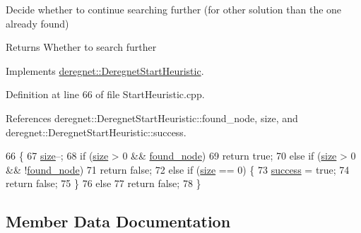 Decide whether to continue searching further (for other solution than the one already found) 

\begin{DoxyReturn}{Returns}
Whether to search further 
\end{DoxyReturn}


Implements \hyperlink{classderegnet_1_1DeregnetStartHeuristic_ac3ee2c3022512f9d4ec7a6b49358e60a}{deregnet\+::\+Deregnet\+Start\+Heuristic}.



Definition at line 66 of file Start\+Heuristic.\+cpp.



References deregnet\+::\+Deregnet\+Start\+Heuristic\+::found\+\_\+node, size, and deregnet\+::\+Deregnet\+Start\+Heuristic\+::success.


\begin{DoxyCode}
66                                     \{
67     \hyperlink{classderegnet_1_1StartHeuristic_acd3b3c6a5103491c252b774545ad470b}{size}--;
68     \textcolor{keywordflow}{if} (\hyperlink{classderegnet_1_1StartHeuristic_acd3b3c6a5103491c252b774545ad470b}{size} > 0 && \hyperlink{classderegnet_1_1DeregnetStartHeuristic_a1ca705794583fb3b6e563efeceb4445e}{found\_node})
69         \textcolor{keywordflow}{return} \textcolor{keyword}{true};
70     \textcolor{keywordflow}{else} \textcolor{keywordflow}{if} (\hyperlink{classderegnet_1_1StartHeuristic_acd3b3c6a5103491c252b774545ad470b}{size} > 0 && !\hyperlink{classderegnet_1_1DeregnetStartHeuristic_a1ca705794583fb3b6e563efeceb4445e}{found\_node})
71         \textcolor{keywordflow}{return} \textcolor{keyword}{false};
72     \textcolor{keywordflow}{else} \textcolor{keywordflow}{if} (\hyperlink{classderegnet_1_1StartHeuristic_acd3b3c6a5103491c252b774545ad470b}{size} == 0) \{
73         \hyperlink{classderegnet_1_1DeregnetStartHeuristic_a72fd16ee027f6aa973f1ff29746addba}{success} = \textcolor{keyword}{true};
74         \textcolor{keywordflow}{return} \textcolor{keyword}{false};
75     \}
76     \textcolor{keywordflow}{else}
77         \textcolor{keywordflow}{return} \textcolor{keyword}{false};
78 \}
\end{DoxyCode}


\subsection{Member Data Documentation}
\mbox{\label{classderegnet_1_1StartHeuristic_acd3b3c6a5103491c252b774545ad470b}} 
